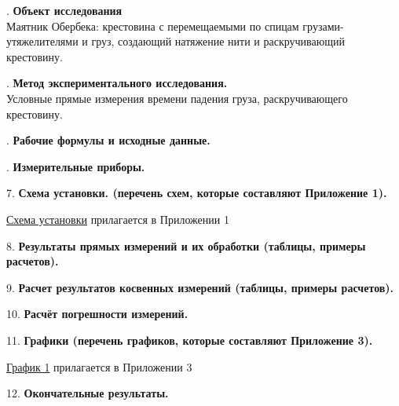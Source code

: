 \documentclass[12pt]{article}
\begin{document}
    \mediumvspace

    . \textbf{Объект исследования} \\
    Маятник Обербека: крестовина с перемещаемыми по спицам грузами-утяжелителями и груз, создающий натяжение нити и раскручивающий крестовину.

    \mediumvspace

    . \textbf{Метод экспериментального исследования.} \\
    Условные прямые измерения времени падения груза, раскручивающего крестовину.

    \newpage    

    . \textbf{Рабочие формулы и исходные данные.}

    

    \mediumvspace

    . \textbf{Измерительные приборы.}

    \smallvspace

    

    \mediumvspace

    7. \textbf{Схема установки. (перечень схем, которые составляют Приложение 1).}

    \hyperlink{schema1}{Схема установки} прилагается в Приложении 1

    \mediumvspace

    8. \textbf{Результаты прямых измерений и их обработки (таблицы, примеры расчетов).}

    

    \mediumvspace

    9. \textbf{Расчет результатов косвенных измерений (таблицы, примеры расчетов).}

    

    \mediumvspace

    10. \textbf{Расчёт погрешности измерений.}

    \mediumvspace

    11. \textbf{Графики (перечень графиков, которые составляют Приложение 3).}

    \hyperlink{diagram1}{График 1} прилагается в Приложении 3

    \mediumvspace

    12. \textbf{Окончательные результаты.}

    

    \mediumvspace
\end{document}
